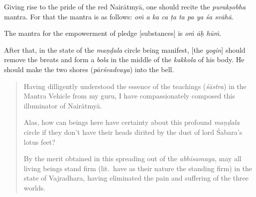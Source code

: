 \documentclass[naipra.tex]{subfiles}
\begin{document}
Giving rise to the pride of the red Nairātmyā, one should recite the \emph{purakṣobha} mantra.
For that the mantra is as follows: \emph{oṁ a ka ca ṭa ta pa ya śa svāhā}.

The mantra for the empowerment of pledge [substances] is \emph{oṁ āḥ hūṁ}.

After that, in the state of the \emph{maṇḍala} circle being manifest, [the \emph{yogin}] should remove the breats and form a \emph{bola} in the middle of the \emph{kakkola} of his body.
He should make the two shores (\emph{pārśvadvaya}) into the bell.

\begin{quote}
	Having dilligently understood the essence of the teachings (\emph{śāstra}) in the Mantra Vehicle from my guru, I have compassionately composed this illuminator of Nairātmyā.

	Alas, how can beings here have certainty about this profound \emph{maṇḍala} circle if they don't have their heads dirited by the dust of lord Śabara's lotus feet?

	By the merit obtained in this spreading out of the \emph{abhisamaya}, may all living beings stand firm (lit.\ have as their nature the standing firm) in the state of Vajradhara, having eliminated the pain and suffering of the three worlds. 
\end{quote}
\end{document}
